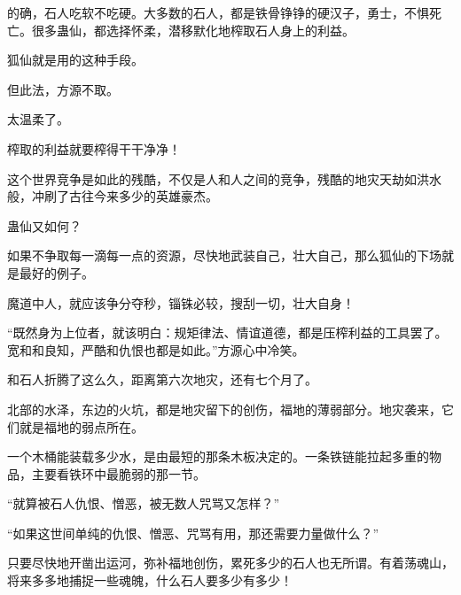 \begin{this_body}
的确，石人吃软不吃硬。大多数的石人，都是铁骨铮铮的硬汉子，勇士，不惧死亡。很多蛊仙，都选择怀柔，潜移默化地榨取石人身上的利益。

狐仙就是用的这种手段。

但此法，方源不取。

太温柔了。

榨取的利益就要榨得干干净净！

这个世界竞争是如此的残酷，不仅是人和人之间的竞争，残酷的地灾天劫如洪水般，冲刷了古往今来多少的英雄豪杰。

蛊仙又如何？

如果不争取每一滴每一点的资源，尽快地武装自己，壮大自己，那么狐仙的下场就是最好的例子。

魔道中人，就应该争分夺秒，锱铢必较，搜刮一切，壮大自身！

“既然身为上位者，就该明白：规矩律法、情谊道德，都是压榨利益的工具罢了。宽和和良知，严酷和仇恨也都是如此。”方源心中冷笑。

和石人折腾了这么久，距离第六次地灾，还有七个月了。

北部的水泽，东边的火坑，都是地灾留下的创伤，福地的薄弱部分。地灾袭来，它们就是福地的弱点所在。

一个木桶能装载多少水，是由最短的那条木板决定的。一条铁链能拉起多重的物品，主要看铁环中最脆弱的那一节。

“就算被石人仇恨、憎恶，被无数人咒骂又怎样？”

“如果这世间单纯的仇恨、憎恶、咒骂有用，那还需要力量做什么？”

只要尽快地开凿出运河，弥补福地创伤，累死多少的石人也无所谓。有着荡魂山，将来多多地捕捉一些魂魄，什么石人要多少有多少！

\end{this_body}

